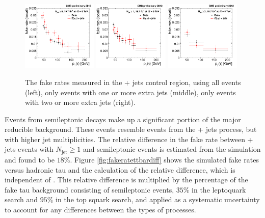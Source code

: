 \begin{figure}[hbt]
  \begin{center}
    \includegraphics[width=0.32\textwidth]{figures/bkgEstim/tfr_dmc.pdf}
    \includegraphics[width=0.32\textwidth]{figures/bkgEstim/tfr_dmc_1jet.pdf}
    \includegraphics[width=0.32\textwidth]{figures/bkgEstim/tfr_dmc_2jet.pdf}
    \caption{The fake rates measured in the \Zmm + jets control region, using all events (left), only events with one or more extra jets (middle), only events with two or more extra jets (right). \label{Bkg:fig:fakerate}}
  \end{center}
\end{figure}

Events from semileptonic \ttbar decays make up a significant portion of the major reducible background. These events resemble events from the \W + jets process, but with higher jet multiplicities. The relative difference in the fake rate between \Zmm + jets events with $N_{\text{jet}} \geq 1$ and semileptonic \ttbar events is estimated from the simulation and found to be $18\%$. Figure \ref{fig:fakeratettbardiff} shows the simulated fake rates versus hadronic tau \pt and the calculation of the relative difference, which is independent of \pt. This relative difference is multiplied by the percentage of the fake tau background consisting of semileptonic \ttbar events, $35\%$ in the leptoquark search and $95\%$ in the top squark search, and applied as a systematic uncertainty to account for any differences between the types of processes.

